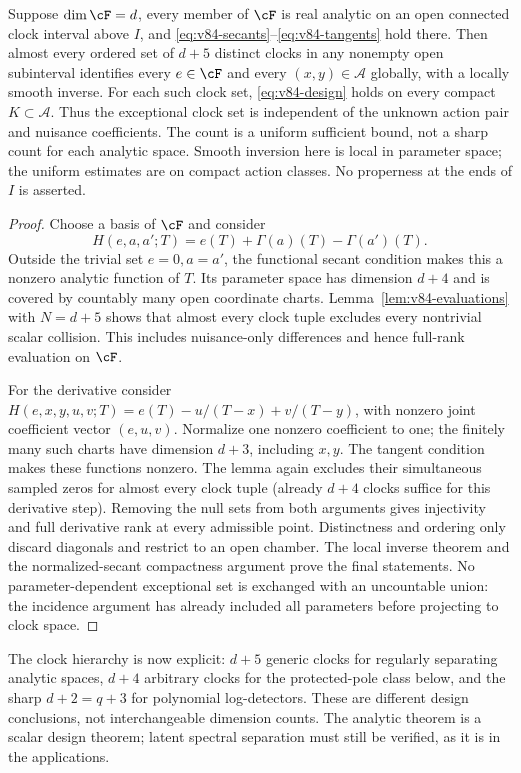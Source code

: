 \begin{theorem}
\label{thm:v84-generic}
Suppose $\dim\cF=d$, every member of $\cF$ is real analytic on an
open connected clock interval above $I$, and
\eqref{eq:v84-secants}--\eqref{eq:v84-tangents} hold there. Then almost
every ordered set of $d+5$ distinct clocks in any nonempty open
subinterval identifies every $e\in\cF$ and every $(x,y)\in\mathcal A$
globally, with a locally smooth inverse. For each such clock set,
\eqref{eq:v84-design} holds on every compact $K\subset\mathcal A$.
Thus the exceptional clock set is independent of the unknown action
pair and nuisance coefficients. The count is a uniform sufficient
bound, not a sharp count for each analytic space. Smooth inversion here
is local in parameter space; the uniform estimates are on compact
action classes. No properness at the ends of $I$ is asserted.
\end{theorem}
\begin{proof}
Choose a basis of $\cF$ and consider
\[
 H(e,a,a';T)=e(T)+\Gamma(a)(T)-\Gamma(a')(T).
\]
Outside the trivial set $e=0,a=a'$, the functional secant condition
makes this a nonzero analytic function of $T$. Its parameter space
has dimension $d+4$ and is covered by countably many open coordinate
charts. Lemma~\ref{lem:v84-evaluations} with $N=d+5$ shows that almost
every clock tuple excludes every nontrivial scalar collision. This
includes nuisance-only differences and hence full-rank evaluation on
$\cF$.

For the derivative consider
$H(e,x,y,u,v;T)=e(T)-u/(T-x)+v/(T-y)$, with nonzero joint coefficient
vector $(e,u,v)$. Normalize one nonzero coefficient to one; the
finitely many such charts have dimension $d+3$, including $x,y$.
The tangent condition makes these functions nonzero. The lemma again
excludes their simultaneous sampled zeros for almost every clock
tuple (already $d+4$ clocks suffice for this derivative step).
Removing the null sets from both arguments gives injectivity and
full derivative rank at every admissible point. Distinctness and
ordering only discard diagonals and restrict to an open chamber.
The local inverse theorem and the normalized-secant compactness
argument prove the final statements. No parameter-dependent exceptional
set is exchanged with an uncountable union: the incidence argument
has already included all parameters before projecting to clock space.
\end{proof}
The clock hierarchy is now explicit: $d+5$ generic clocks for regularly
separating analytic spaces, $d+4$ arbitrary clocks for the protected-pole
class below, and the sharp $d+2=q+3$ for polynomial log-detectors.
These are different design conclusions, not interchangeable dimension
counts. The analytic theorem is a scalar design theorem; latent
spectral separation must still be verified, as it is in the applications.

